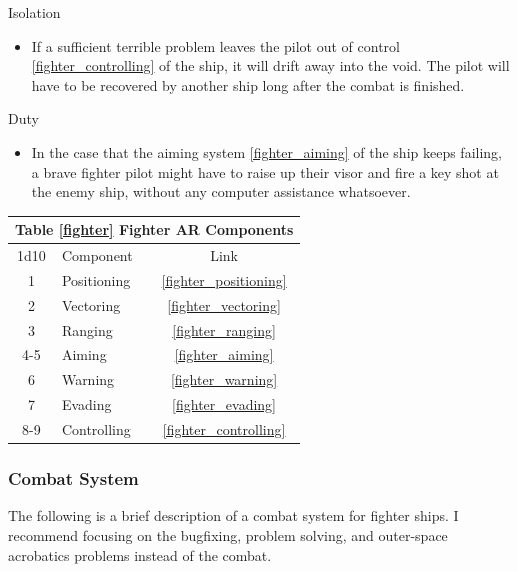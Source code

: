 \documentclass[a4paper]{article}
\begin{document}
\begin{minipage}[t]{0.4\linewidth}
Isolation
\begin{itemize}
\item If a sufficient terrible problem leaves the pilot out of control \ref{fighter_controlling} of the ship, it will drift away into the void. The pilot will have to be recovered by another ship long after the combat is finished.
\end{itemize}
\end{minipage}
\begin{minipage}[t]{0.4\linewidth}
Duty
\begin{itemize}
\item In the case that the aiming system \ref{fighter_aiming} of the ship keeps failing, a brave fighter pilot might have to raise up their visor and fire a key shot at the enemy ship, without any computer assistance whatsoever. 
\end{itemize}
\end{minipage}

\vspace{0.5cm} \hspace{0.25\linewidth}
\begin{tabular}{@{} | c | l | c | @{}}
\toprule
\multicolumn{3}{|l|}{Table \ref{fighter} Fighter AR Components} \\
\toprule
1d10 & Component & Link \\
\midrule
1 & Positioning & \ref{fighter_positioning} \\
2 & Vectoring & \ref{fighter_vectoring} \\
3 & Ranging & \ref{fighter_ranging} \\
4-5 & Aiming & \ref{fighter_aiming} \\
6 & Warning & \ref{fighter_warning} \\
7 & Evading & \ref{fighter_evading} \\
8-9 & Controlling & \ref{fighter_controlling} \\

\bottomrule
\end{tabular}


\subsubsection{Combat System} \label{fighter_combat_system}

The following is a brief description of a combat system for fighter ships. I recommend focusing on the bugfixing, problem solving, and outer-space acrobatics problems instead of the combat.
\end{document}
